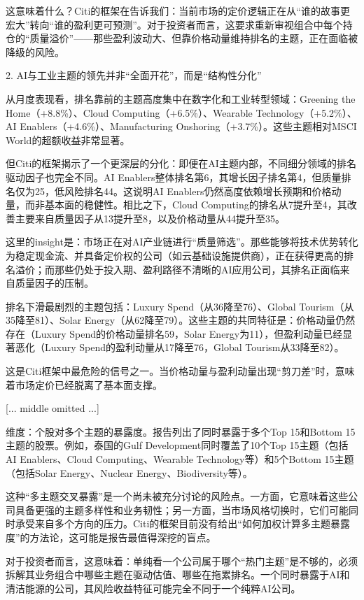 \documentclass[11pt]{ctexart}
\begin{document}
这意味着什么？Citi的框架在告诉我们：当前市场的定价逻辑正在从“谁的故事更宏大”转向“谁的盈利更可预测”。对于投资者而言，这要求重新审视组合中每个持仓的“质量溢价”——那些盈利波动大、但靠价格动量维持排名的主题，正在面临被降级的风险。

2. AI与工业主题的领先并非“全面开花”，而是“结构性分化”

从月度表现看，排名靠前的主题高度集中在数字化和工业转型领域：Greening the Home（+8.8\%）、Cloud Computing（+6.5\%）、Wearable Technology（+5.2\%）、AI Enablers（+4.6\%）、Manufacturing Onshoring（+3.7\%）。这些主题相对MSCI World的超额收益非常显著。

但Citi的框架揭示了一个更深层的分化：即便在AI主题内部，不同细分领域的排名驱动因子也完全不同。AI Enablers整体排名第6，其增长因子排名第4，但质量排名仅为25，低风险排名44。这说明AI Enablers仍然高度依赖增长预期和价格动量，而非基本面的稳健性。相比之下，Cloud Computing的排名从7提升至4，其改善主要来自质量因子从13提升至8，以及价格动量从44提升至35。

这里的insight是：市场正在对AI产业链进行“质量筛选”。那些能够将技术优势转化为稳定现金流、并具备定价权的公司（如云基础设施提供商），正在获得更高的排名溢价；而那些仍处于投入期、盈利路径不清晰的AI应用公司，其排名正面临来自质量因子的压制。

排名下滑最剧烈的主题包括：Luxury Spend（从36降至76）、Global Tourism（从35降至81）、Solar Energy（从62降至79）。这些主题的共同特征是：价格动量仍然存在（Luxury Spend的价格动量排名59，Solar Energy为11），但盈利动量已经显著恶化（Luxury Spend的盈利动量从17降至76，Global Tourism从33降至82）。

这是Citi框架中最危险的信号之一。当价格动量与盈利动量出现“剪刀差”时，意味着市场定价已经脱离了基本面支撑。

[... middle omitted ...]

维度：个股对多个主题的暴露度。报告列出了同时暴露于多个Top 15和Bottom 15主题的股票。例如，泰国的Gulf Development同时覆盖了10个Top 15主题（包括AI Enablers、Cloud Computing、Wearable Technology等）和5个Bottom 15主题（包括Solar Energy、Nuclear Energy、Biodiversity等）。

这种“多主题交叉暴露”是一个尚未被充分讨论的风险点。一方面，它意味着这些公司具备更强的主题多样性和业务韧性；另一方面，当市场风格切换时，它们可能同时承受来自多个方向的压力。Citi的框架目前没有给出“如何加权计算多主题暴露度”的方法论，这可能是报告最值得深挖的盲点。

对于投资者而言，这意味着：单纯看一个公司属于哪个“热门主题”是不够的，必须拆解其业务组合中哪些主题在驱动估值、哪些在拖累排名。一个同时暴露于AI和清洁能源的公司，其风险收益特征可能完全不同于一个纯粹AI公司。
\end{document}
